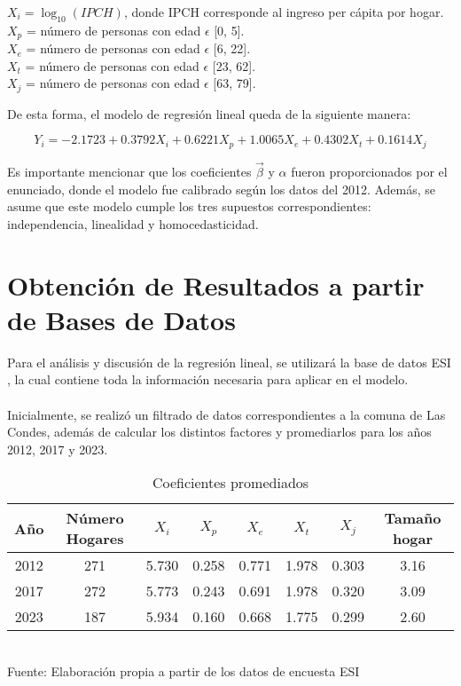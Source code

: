 \documentclass[12pt]{article} %
\begin{document}
\begin{center}
    $X_i = \log_{10}(IPCH)$, donde IPCH corresponde al ingreso per cápita por hogar.\\
    $X_p$ = número de personas con edad $\epsilon$ [0, 5].\\
    $X_e$ = número de personas con edad $\epsilon$ [6, 22].\\
    $X_t$ = número de personas con edad $\epsilon$ [23, 62].\\
    $X_j$ = número de personas con edad $\epsilon$ [63, 79].
\end{center}

De esta forma, el modelo de regresión lineal queda de la siguiente manera:

\begin{equation}
    Y_i = -2.1723 + 0.3792X_i + 0.6221X_p + 1.0065X_e + 0.4302X_t + 0.1614X_j
    \label{eq:regresion}
\end{equation}

Es importante mencionar que los coeficientes $\vec{\beta}$ y $\alpha$ fueron proporcionados por el enunciado, donde el modelo fue calibrado según los datos del 2012. Además, se asume que este modelo cumple los tres supuestos correspondientes: independencia, linealidad y homocedasticidad.

\section{Obtención de Resultados a partir de Bases de Datos}

Para el análisis y discusión de la regresión lineal, se utilizará la base de datos ESI \textbf{\cite{esi}}, la cual contiene toda la información necesaria para aplicar en el modelo.
\\ \\
Inicialmente, se realizó un filtrado de datos correspondientes a la comuna de Las Condes, además de calcular los distintos factores y promediarlos para los años 2012, 2017 y 2023.

\begin{table}[H]
    \centering
    \caption{Coeficientes promediados}
    \vspace{0.2cm}
    \begin{tabular}{|c|c|c|c|c|c|c|c|}
        \hline
        Año & Número Hogares & $X_i$ & $X_p$ & $X_e$ & $X_t$ & $X_j$ & Tamaño hogar \\
        \hline
        2012 & 271 & 5.730 & 0.258 & 0.771 & 1.978 & 0.303 & 3.16\\
        2017 & 272 & 5.773 & 0.243 & 0.691 & 1.978 & 0.320 & 3.09\\
        2023 & 187 & 5.934 & 0.160 & 0.668 & 1.775 & 0.299 & 2.60\\
        \hline
    \end{tabular}
    \vspace{0.2cm}
    \\Fuente: Elaboración propia a partir de los datos de encuesta ESI \textbf{\cite{esi}}
\end{table}
\end{document}
